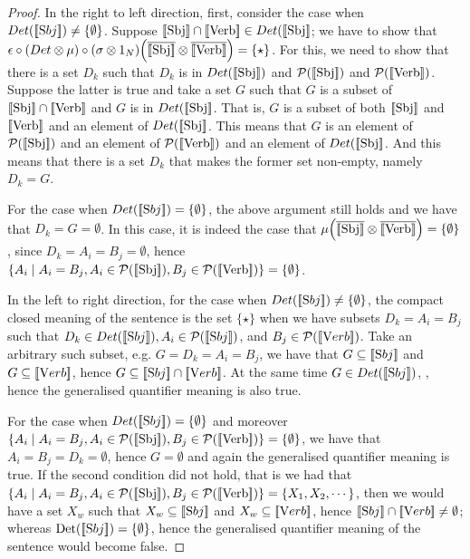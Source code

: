\begin{proof}
In the right to left direction,  first, consider the case when  $Det([\![ \text Sbj ]\!]) \neq \{\emptyset\}$.   Suppose $[\![ \text{Sbj} ]\!] \cap [\![ \text{Verb} ]\!] \in Det([\![ \text{Sbj} ]\!]$; we have to show that $\epsilon \circ (Det \otimes \mu) \circ (\sigma \otimes 1_N) \Big(\overline{[\![ \text{Sbj} ]\!]} \otimes \overline{[\![ \text{Verb} ]\!]} \Big) = \{\star\}$.  For this, we need to show that there is a set $D_k$ such that $D_k$ is in $Det([\![ \text{Sbj} ]\!])$ and $ {\cal P} ([\![ \text{Sbj} ]\!])$ and  ${\cal P} ([\![ \text{Verb} ]\!])$.  Suppose the latter is true and take a set $G$ such that $G$ is a subset of $[\![ \text{Sbj} ]\!] \cap [\![ \text{Verb} ]\!]$ and $G$ is  in $Det([\![ \text{Sbj} ]\!]$.  That is, $G$ is a subset of  both $[\![ \text{Sbj} ]\!]$ and $ [\![ \text{Verb} ]\!]$ and an element of $Det([\![ \text{Sbj} ]\!]$. This means that $G$ is an element of $ {\cal P} ([\![ \text{Sbj} ]\!])$ and an element of  ${\cal P} ([\![ \text{Verb} ]\!])$ and an element of $Det([\![ \text{Sbj} ]\!]$. And this means that  there is a set $D_k$ that makes the former set non-empty, namely $D_k = G$.  

For the case when   $Det([\![ \text Sbj ]\!]) = \{\emptyset\}$, the above argument still holds and we have that $D_k = G = \emptyset$.  In this case, it is indeed the case that $\mu\Big(\overline{[\![ \text{Sbj} ]\!]} \otimes \overline{[\![ \text{Verb} ]\!]} \Big) = \{\emptyset\}$,  since $D_k = A_i = B_j = \emptyset$, hence   $\{A_i \mid A_i = B_j, A_i \in {\cal P} ([\![ \text{Sbj} ]\!]), B_j \in  {\cal P}([\![ \text{Verb} ]\!])\} = 
\{\emptyset\}$. 

In the left to right direction, for the case when $Det([\![ \text Sbj ]\!]) \neq \{\emptyset\}$, the compact closed meaning of the sentence is the set $\{\star\}$ when we have  subsets $D_k = A_i = B_j$ such that $D_k \in Det([\![ \text Sbj ]\!]), A_i \in {\cal P}([\![ \text Sbj ]\!])$, and $B_j \in {\cal P}([\![ \text Verb ]\!])$.  Take an arbitrary such subset, e.g.  $G = D_k = A_i = B_j$, we have that $G \subseteq [\![ \text Sbj ]\!]$ and $G \subseteq [\![ \text Verb ]\!]$, hence $G \subseteq [\![ \text Sbj ]\!]  \cap [\![ \text Verb ]\!]$. At the same time $G \in Det([\![ \text Sbj ]\!])$, , hence the generalised quantifier meaning is also true.  

For the case when $Det([\![ \text Sbj ]\!]) = \{\emptyset\}$ and moreover $\{A_i \mid A_i = B_j, A_i \in {\cal P} ([\![ \text{Sbj} ]\!]), B_j \in  {\cal P}([\![ \text{Verb} ]\!])\} = \{\emptyset\}$, we have that $A_i = B_j = D_k = \emptyset$, hence $G = \emptyset$ and again the generalised quantifier meaning is true. If the second condition did not hold, that is we had that $\{A_i \mid A_i = B_j, A_i \in {\cal P} ([\![ \text{Sbj} ]\!]), B_j \in  {\cal P}([\![ \text{Verb} ]\!])\} = \{X_1, X_2, \cdots\}$, then we would have a set $X_w$ such that $X_w \subseteq [\![ \text Sbj ]\!]$ and $X_w \subseteq [\![ \text Verb ]\!]$,  hence $[\![ \text Sbj ]\!] \cap [\![ \text Verb ]\!] \neq \emptyset$;  whereas $\mathrm{Det}([\![ \text Sbj ]\!]) = \{\emptyset\}$, hence the generalised quantifier meaning of the sentence would become false. 



\end{proof}
